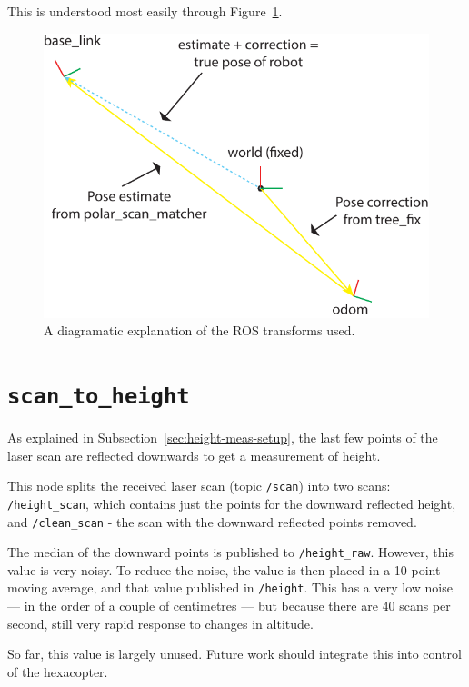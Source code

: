\documentclass[12pt,oneside,a4paper]{book}
\begin{document}
This is understood most easily through Figure~\ref{fig:rostf}.

\begin{figure}[h!]
  \centering
  \includegraphics[width=\textwidth]{figs/rostf}
  \caption{A diagramatic explanation of the ROS transforms used.}
  \label{fig:rostf}
\end{figure}

\newpage
\section{\texttt{scan\_to\_height}}
\label{sec:scan_to_height}

As explained in Subsection~\ref{sec:height-meas-setup}, the last few
points of the laser scan are reflected downwards to get a measurement
of height.

This node splits the received laser scan (topic \texttt{/scan}) into
two scans: \texttt{/height\_scan}, which contains just the points for
the downward reflected height, and \texttt{/clean\_scan} - the scan
with the downward reflected points removed.

The median of the downward points is published to
\texttt{/height\_raw}. However, this value is very noisy. To reduce
the noise, the value is then placed in a 10 point moving average, and
that value published in \texttt{/height}. This has a very low noise
--- in the order of a couple of centimetres --- but because there are
40 scans per second, still very rapid response to changes in altitude.

So far, this value is largely unused. Future work should integrate
this into control of the hexacopter.
\end{document}
